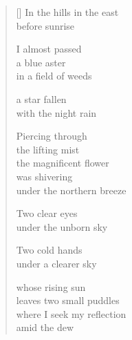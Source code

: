 \documentclass[12pt,a4paper]{article}
\begin{document}
\thispagestyle{empty}

\poemtitle{}

\settowidth{\versewidth}{where I seek my reflection}

\bigskip

\begin{verse}[\versewidth]
  In the hills in the east \\
  before sunrise

  I almost passed \\
  a blue aster \\
  in a field of weeds

  a star fallen \\
  with the night rain

  Piercing through \\
  the lifting mist \\
  the magnificent flower \\
  was shivering \\
  under the northern breeze

  Two clear eyes \\
  under the unborn sky

  Two cold hands \\
  under a clearer sky

  whose rising sun \\
  leaves two small puddles \\
  where I seek my reflection \\
  amid the dew
\end{verse}
\end{document}
